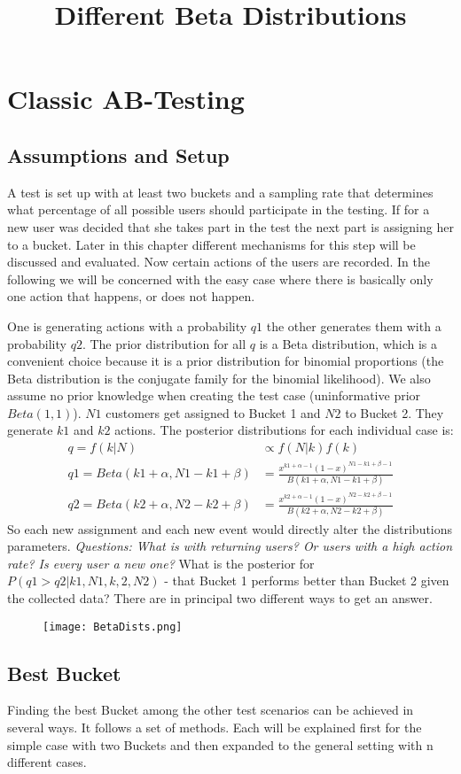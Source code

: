 \documentclass[../Thesis.tex]{subfiles}
\begin{document}
\chapter{Classic AB-Testing}
\section{Assumptions and Setup}
A test is set up with at least two buckets and a sampling rate that determines what percentage of all possible users should participate in the testing. If for a new user was decided that she takes part in the test the next part is assigning her to a bucket. Later in this chapter different mechanisms for this step will be discussed and evaluated. Now certain actions of the users are recorded. In the following we will be concerned with the easy case where there is basically only one action that happens, or does not happen.

 One is generating actions with a probability $q1$ the other generates them with a probability $q2$. The prior distribution for all $q$ is a Beta distribution, which is a convenient choice because it is a prior distribution for binomial proportions (the Beta distribution is the conjugate family for the binomial likelihood). We also assume no prior knowledge when creating the test case (uninformative prior $Beta(1,1)$). $N1$ customers get assigned to Bucket 1 and $N2$ to Bucket 2. They generate $k1$ and $k2$ actions. The posterior distributions for each individual case is:
\begin{align*}
q = f(k|N) &\propto f(N|k)f(k)\\
q1 = Beta(k1+\alpha,N1-k1+\beta) & = \frac{x^{k1+\alpha-1}(1-x)^{N1-k1+\beta -1}}{B(k1+\alpha,N1-k1+\beta)} \\
q2 = Beta(k2+\alpha,N2-k2+\beta) & = \frac{x^{k2+\alpha-1}(1-x)^{N2-k2+\beta -1}}{B(k2+\alpha,N2-k2+\beta)}
\end{align*}
So each new assignment and each new event would directly alter the distributions parameters.\textit{ Questions: What is with returning users? Or users with a high action rate? Is every user a new one?}
What is the posterior for $P(q1>q2 | k1,N1,k,2,N2)$ - that Bucket 1 performs better than Bucket 2 given the collected data? There are in principal two different ways to get an answer.
\begin{figure}[h]
\texttt{[image: BetaDists.png]}
\centering
\title{Different Beta Distributions}
\end{figure}

\section{Best Bucket}
Finding the best Bucket among the other test scenarios can be achieved in several ways. It follows a set of methods. Each will be explained first for the simple case with two Buckets and then expanded to the general setting with n different cases.
\end{document}
